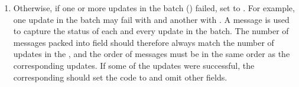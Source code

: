 \documentclass[11pt]{article}
\begin{document}
{\begin{enumerate}
\item{}
Otherwise, if one or more updates in the batch ()
failed, set  to . For example, one update in
the batch may fail with  and another with
. A  message is used to capture the status of
each and every update in the batch. The number of  messages packed
into  field should therefore always match the
number of updates in the , and the order of
 messages must be in the same order as the corresponding
updates. If some of the updates were successful, the corresponding
 should set the code to  and omit other fields.%
\end{enumerate}%

}
\end{document}
